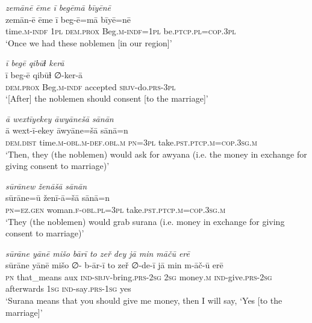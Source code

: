 \ea \label{RE.56}
\textit{zemānē ēme ī begēmā bīyēnē} \\ 
\gll zemān-ē ēme ī beg-ē=mā bīyē=nē \\ 
 time\textsc{.m}\textsc{-indf} \textsc{1pl} \textsc{dem.prox} Beg\textsc{.m}\textsc{-indf}\textsc{=\textsc{1pl}} be\textsc{.ptcp}\textsc{.pl}\textsc{=cop}\textsc{.3pl} \\ 
\glt `Once we had these noblemen [in our region]'
\z 
 
\ea \label{RE.57}
\textit{ī begē qibūɫ kerā} \\ 
\gll ī beg-ē qibūɫ ∅-ker-ā \\ 
 \textsc{dem.prox} Beg\textsc{.m}\textsc{-indf} accepted \textsc{sbjv-}do\textsc{.prs}\textsc{-3pl} \\ 
\glt `[After] the noblemen should consent [to the marriage]'
\z 
 
\ea \label{RE.58}
\textit{ā wextīyekey āwyānešā sānān} \\ 
\gll ā wext-ī-ekey āwyāne=šā sānā=n \\ 
 \textsc{dem.dist} time\textsc{.m}\textsc{-obl}\textsc{.m}\textsc{-def}\textsc{.obl}\textsc{.m} \textsc{pn}\textsc{=3pl} take\textsc{.pst}\textsc{.ptcp}\textsc{.m}\textsc{=cop}\textsc{.3sg}\textsc{.m} \\ 
\glt `Then, they (the noblemen) would ask for awyana (i.e. the money in exchange for giving consent to marriage)'
\z 
 
\ea \label{RE.59}
\textit{sūrānew ženāšā sānān} \\ 
\gll sūrāne=ū ženī-ā=šā sānā=n \\ 
 \textsc{pn}\textsc{=ez.gen} woman\textsc{.f}\textsc{-obl}\textsc{.pl}\textsc{=3pl} take\textsc{.pst}\textsc{.ptcp}\textsc{.m}\textsc{=cop}\textsc{.3sg}\textsc{.m} \\ 
\glt `They (the noblemen) would grab surana (i.e. money in exchange for giving consent to marriage)'
\z 
 
\ea \label{RE.60}
\textit{sūrāne yānē mišo bārī to zeř dey jā min māčū erē} \\ 
\gll sūrāne yānē mišo ∅- b-ār-ī to zeř ∅-de-ī jā min m-āč-ū erē \\ 
 \textsc{pn} that\_means aux \textsc{ind-}\textsc{sbjv-}bring\textsc{.prs}-\textsc{2sg} \textsc{2sg} money\textsc{.m} \textsc{ind-}give\textsc{.prs}-\textsc{2sg} afterwards \textsc{1sg} \textsc{ind-}say\textsc{.prs}\textsc{-\textsc{1sg}} yes \\ 
\glt `Surana means that you should give me money, then I will say, ‘Yes [to the marriage]'
\z 
 
